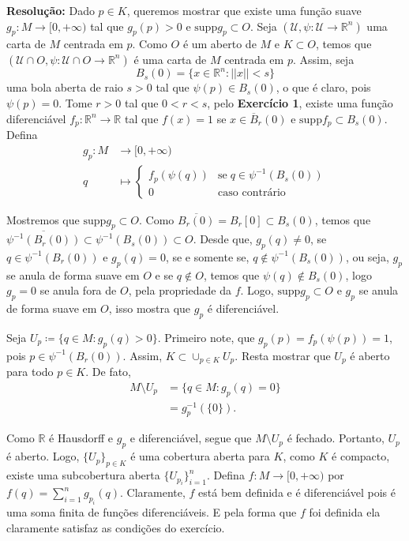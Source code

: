 \documentclass[twoside,openright,titlepage,numbers=noenddot,headinclude,  lineheaders footinclude=true,cleardoublepage=empty,BCOR=5mm,paper=a4,fontsize=12pt ]{scrbook}
\newcommand{\R}{\mathbb R}
\begin{document}
\textbf{Resolução:} 
Dado $p \in K$, queremos mostrar que existe uma função suave $g_p : M \rightarrow [0, + \infty)$ tal que $g_p(p) > 0$ e $\text{supp}g_p \subset O$. 
Seja $(\mathcal{U}, \psi : \mathcal{U}\rightarrow \R^n)$ uma carta de $M$ centrada em $p$. 
Como $O$ é um aberto de $M$ e $K \subset O$, temos que $(\mathcal{U} \cap O , \psi : \mathcal{U} \cap O \rightarrow \R^n)$ é uma carta de $M$ centrada em $p$. 
Assim, seja 
\begin{equation*}
B_s(0) = \{x \in \R^n : ||x || < s\}
\end{equation*} 
uma bola aberta de raio $s > 0$ tal que $\psi(p) \in B_s(0)$, o que é claro, pois $\psi(p) = 0$. 
Tome $r > 0$ tal que $0 < r < s$, pelo \textbf{Exercício 1}, existe uma função diferenciável $f_p : \R^n \rightarrow \R$ tal que $f(x) = 1$ se $x \in \overline{B}_r(0)$ e $\text{supp}f_p \subset B_s(0)$. 
Defina 
\begin{align*}
g_p : M &\rightarrow [0, + \infty) \\ 
q &\mapsto \begin{cases}
f_p(\psi(q)) & \text{se}\;  q \in \psi^{-1}(B_s(0)) \\
0  & \text{caso contrário}
\end{cases}
\end{align*}

Mostremos que $\text{supp} g_p \subset O$.
Como $\overline{B_r(0)} = B_r[0] \subset B_s(0)$, temos que $\overline{\psi^{-1}(B_r(0))} \subset \psi^{-1}(B_s(0)) \subset O$. 
Desde que, $g_p(q) \neq 0$, se $q \in \psi^{-1}(B_r(0))$ e $g_p(q) = 0$, se e somente se, $q \notin \psi^{-1}(B_s(0))$, ou seja, $g_p$ se anula de forma suave em $O$ e se $q \notin O$, temos que $\psi(q) \notin B_s(0)$, logo $g_p = 0$ se anula fora de $O$, pela propriedade da $f$. 
Logo, $\text{supp} g_p \subset O$ e $g_p$ se anula de forma suave em $O$, isso mostra que $g_p$ é diferenciável.

Seja $U_p \coloneqq \{q \in M : g_p(q) > 0\}$.
Primeiro note, que $g_p(p) = f_p(\psi(p)) = 1$, pois $p \in \psi^{-1}(B_r(0))$. 
Assim, $K \subset \cup_{ p \in K} U_p$. 
Resta mostrar que $U_p$ é aberto para todo $p \in K$. 
De fato, \begin{align*}
M \setminus U_p &= \{q \in M : g_p(q) = 0\} \\ &= g_p^{-1}(\{0\}).
\end{align*} 

Como $\R$ é Hausdorff e $g_p$ 
e diferenciável, segue que $M \setminus U_p$ é fechado. 
Portanto, $U_p$ é aberto. 
Logo, $\{U_p\}_{p \in K}$ é uma cobertura aberta para $K$, como $K$ é compacto, existe uma subcobertura aberta $\{U_{p_i}\}_{i = 1}^n$. 
Defina $f : M \rightarrow [0, + \infty)$ por $f(q) = \sum_{i = 1}^n g_{p_i}(q)$.
Claramente, $f$ está bem definida e é diferenciável pois é uma soma finita de funções diferenciáveis. 
E pela forma que $f$ foi definida ela claramente satisfaz as condições do exercício.
\end{document}
